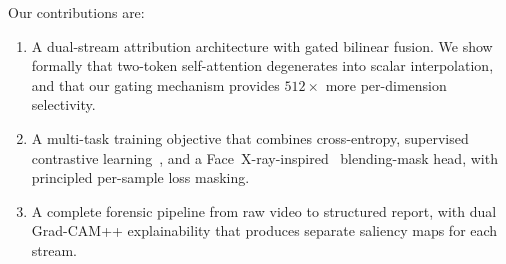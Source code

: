 \smallskip
\noindent Our contributions are:
\begin{enumerate}
    \item A dual-stream attribution architecture with gated bilinear fusion. We show formally that two-token self-attention degenerates into scalar interpolation, and that our gating mechanism provides $512\times$ more per-dimension selectivity.
    \item A multi-task training objective that combines cross-entropy, supervised contrastive learning~\cite{khosla2020supervised}, and a Face~X-ray-inspired~\cite{li2020facexray} blending-mask head, with principled per-sample loss masking.
    \item A complete forensic pipeline from raw video to structured report, with dual Grad-CAM++ explainability that produces separate saliency maps for each stream.
\end{enumerate}
